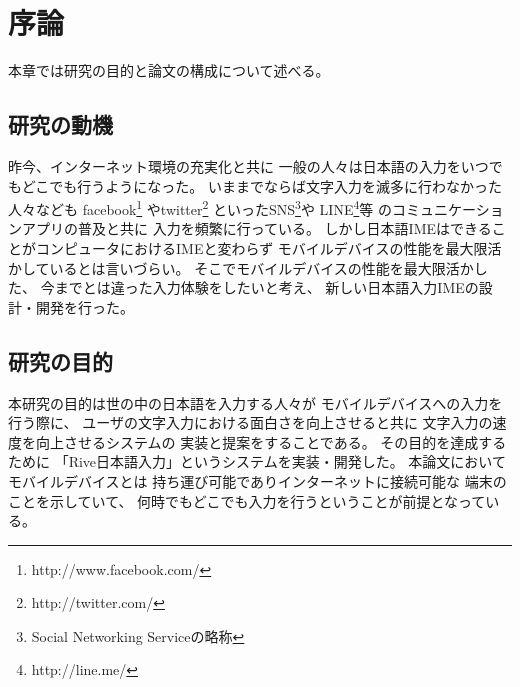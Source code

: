 \chapter{序論}
\label{chap:introduction}
本章では研究の目的と論文の構成について述べる。

\newpage
\section{研究の動機}
昨今、インターネット環境の充実化と共に
一般の人々は日本語の入力をいつでもどこでも行うようになった。
いままでならば文字入力を滅多に行わなかった人々なども
facebook\footnote{http://www.facebook.com/}
やtwitter\footnote{http://twitter.com/}
といったSNS\footnote{Social Networking Serviceの略称}や
LINE\footnote{http://line.me/}等
のコミュニケーションアプリの普及と共に
入力を頻繁に行っている。
しかし日本語IMEはできることがコンピュータにおけるIMEと変わらず
モバイルデバイスの性能を最大限活かしているとは言いづらい。
そこでモバイルデバイスの性能を最大限活かした、
今までとは違った入力体験をしたいと考え、
新しい日本語入力IMEの設計・開発を行った。

\section{研究の目的}
本研究の目的は世の中の日本語を入力する人々が
モバイルデバイスへの入力を行う際に、
ユーザの文字入力における面白さを向上させると共に
文字入力の速度を向上させるシステムの
実装と提案をすることである。
その目的を達成するために
「Rive日本語入力」というシステムを実装・開発した。
本論文においてモバイルデバイスとは
持ち運び可能でありインターネットに接続可能な
端末のことを示していて、
何時でもどこでも入力を行うということが前提となっている。

